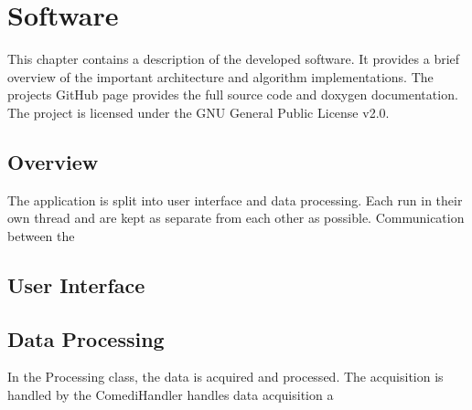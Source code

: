 \chapter[sw]{Software}

This chapter contains a description of the developed software. It provides a brief overview of the important architecture and algorithm implementations. The projects GitHub page provides the full source code and doxygen documentation.  The project is licensed under the GNU General Public License v2.0. 

\section{Overview}
The application is split into user interface and data processing. Each run in their own thread and are kept as separate from each other as possible. Communication between the 

\section{User Interface}

\section{Data Processing}
In the Processing class, the data is acquired and processed. The acquisition is handled by the ComediHandler handles data acquisition a